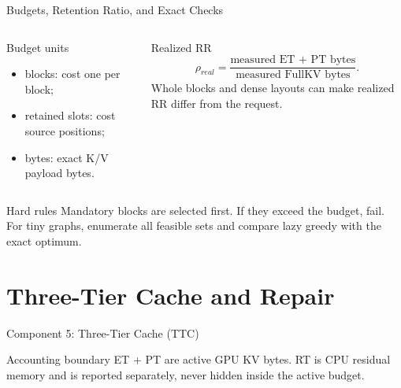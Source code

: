 \documentclass[aspectratio=169,10pt]{beamer}
\newcommand{\tightitems}{\setlength{\itemsep}{0.28em}\setlength{\parskip}{0pt}}
\begin{document}
\begin{frame}{Budgets, Retention Ratio, and Exact Checks}
\small
\begin{columns}[T,onlytextwidth]
\begin{block}{Budget units}
\begin{itemize}\tightitems
  \item blocks: cost one per block;
  \item retained slots: cost source positions;
  \item bytes: exact K/V payload bytes.
\end{itemize}
\end{block}
\begin{block}{Realized RR}
\[
\rho_{real}=\frac{\text{measured ET + PT bytes}}
{\text{measured FullKV bytes}}.
\]
Whole blocks and dense layouts can make realized RR differ from the request.
\end{block}
\end{columns}
\begin{alertblock}{Hard rules}
Mandatory blocks are selected first. If they exceed the budget, fail. For tiny graphs, enumerate
all feasible sets and compare lazy greedy with the exact optimum.
\end{alertblock}
\end{frame}

\section{Three-Tier Cache and Repair}

\begin{frame}{Component 5: Three-Tier Cache (TTC)}
\small
\begin{center}
\end{center}
\begin{block}{Accounting boundary}
ET + PT are active GPU KV bytes. RT is CPU residual memory and is reported separately, never hidden
inside the active budget.
\end{block}
\end{frame}
\end{document}
